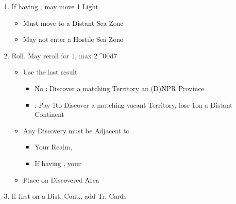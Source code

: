 \documentclass[10pt]{article}
\begin{document}
\begin{enumerate}
	\item If having , may move 1 Light \ship
	\begin{itemize}
		\item Must move to a Distant Sea Zone
		\item May not enter a Hostile Sea Zone
	\end{itemize}
	\item Roll. May reroll for 1\diplopower, max 2^^^^00d7
	\begin{itemize}
		\item Use the last result
		\begin{itemize}
			\item No \skull: Discover a matching Territory  an (D)NPR Province \conj{or} \town {} \vassal
			\item \skull: Pay 1\diplopower to Discover a matching vacant Territory,  lose 1\ship on a Distant Continent
		\end{itemize}
		\item Any Discovery must be Adjacent to
		\begin{itemize}
			\item Your Realm, 
			\item If having , your \ship
		\end{itemize}
		\item Place \claim on Discovered Area
	\end{itemize}
	\item If first \claim on a Dist. Cont., add Tr. Cards
\end{enumerate}
\end{document}
